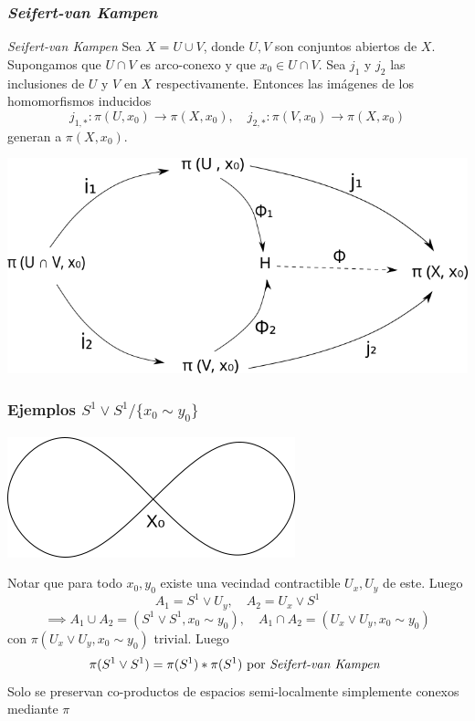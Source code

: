 \documentclass[xetex,mathserif,serif]{beamer}
\newcommand{\vank}{\emph{Seifert-van Kampen} }
\begin{document}
  \begin{frame}
    \frametitle{\vank}
    \begin{block}{\vank}
      Sea \(X = U \cup V\), donde \(U,V\) son conjuntos abiertos de \(X\).
      Supongamos que \(U \cap V\) es arco-conexo y que \(x_0 \in U \cap V\).
      Sea \(j_1\) y \(j_2\) las inclusiones de \(U\) y \(V\) en \(X\)
      respectivamente. Entonces las imágenes de los homomorfismos inducidos
      \[ j_{1,*} : \pi (U, x_0) \to \pi (X, x_0), \quad j_{2,*} : \pi
      (V, x_0) \to \pi (X, x_0) \]
      generan a \(\pi (X,x_0)\).

      \begin{center}
        \includegraphics[scale=.35]{../tesis/imagenes/van.png}
      \end{center}
    \end{block}
  \end{frame}

  \begin{frame}
    \frametitle{Ejemplos \(S^1 \vee S^1 / \{x_0 \sim y_0\}\)}
    \begin{center}
      \includegraphics[scale=0.4]{../tesis/imagenes/figura8.png}
    \end{center}
    \pause
    Notar que para todo \(x_0, y_0\) existe una vecindad contractible
    \(U_x, U_y\) de este. Luego
    \[ A_1 = S^1 \vee U_y , \quad A_2 = U_x \vee S^1 \]
    \[ \implies A_1 \cup A_2 = (S^1 \vee S^1, x_0 \sim y_0) , \quad A_1 \cap A_2
      = (U_x \vee U_y, x_0 \sim y_0) \]
    con \(\pi (U_x \vee U_y, {x_0 \sim y_0})\) trivial. Luego
    \[ \pi (S^1 \vee S^1) = \pi (S^1) * \pi (S^1) \text{ por \vank}\]
    \pause
    Solo se preservan co-productos de espacios semi-localmente
    simplemente conexos mediante \(\pi\)
  \end{frame}
\end{document}
